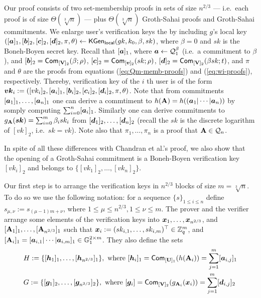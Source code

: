 Our proof consists of two set-membership proofs in sets of size $n^{2/3}$ --- i.e.~each proof is of size $\Theta(\sqrt[3]{n})$ ---  plus $\Theta(\sqrt[3]{n})$ Groth-Sahai proofs and Groth-Sahai commitments.
We enlarge user's verification keys the by including $g$'s local key $([{\boldsymbol{a}}]_1,[{\boldsymbol{b}}]_2,[{\boldsymbol{c}}]_2,[{\boldsymbol{d}}]_2, \pi, \theta)\gets \mathsf{KGen}_{\mathsf{local}}(gk,k_0,\beta,sk)$, where $\beta=0$ and $sk$ is the Boneh-Boyen secret key. Recall that $[{\boldsymbol{a}}]_1$, where ${\boldsymbol{a}}\gets\mathcal{Q}_1^\beta$ (i.e.~a commitment to $\beta$), and $[{\boldsymbol{b}}]_2=\mathsf{Com}_{[\mathbf{{V}}]_2}(\beta;\rho)$, $[{\boldsymbol{c}}]_2=\mathsf{Com}_{[{\boldsymbol{v}}]_2}(sk;\rho)$, $[{\boldsymbol{d}}]_2 = \mathsf{Com}_{[\mathbf{{V}}]_2}(\beta sk;t)$, and $\pi$ and $\theta$ are the proofs from equations (\ref{eq:Qm-memb-proofs}) and (\ref{eq:wi-proofs}), respectively. Thereby, verification key of the $i$ th user is of the form ${\boldsymbol{vk}}_i:=([vk_i]_2,[{\boldsymbol{a}}_i]_1,[{\boldsymbol{b}}_i]_2,[{\boldsymbol{c}}_i]_2,[{\boldsymbol{d}}_i]_2,\pi,\theta)$. Note that from commitments $[{\boldsymbol{a}}_1]_1,\ldots,[{\boldsymbol{a}}_n]_1$ one can derive a commtiment to $h(\mathbf{{A}})=h(({\boldsymbol{a}}_1|\cdots|{\boldsymbol{a}}_n))$ by somply computing $\sum_{i=0}^n [{\boldsymbol{a}}_i]_1$. Similarly one can derive commitments to $g_{\mathbf{{A}}}({\boldsymbol{sk}}) = \sum_{i=0}^m\beta_i sk_i$ from $[{\boldsymbol{d}}_1]_2,\ldots,[{\boldsymbol{d}}_n]_2$ (recall the $sk$ is the discrete logarithm of $[vk]_2$, i.e.~$sk=vk$). Note also that $\pi_1,\ldots,\pi_n$ is a proof that $\mathbf{{A}}\in\mathcal{Q}_n$.

In spite of all these differences with Chandran et al.'s proof, we also show that the opening of a Groth-Sahai commitment is a Boneh-Boyen verification key $[vk_i]_2$ and belongs to $\{[vk_1]_2,\ldots,[vk_n]_2\}$.

Our first step is to arrange the verification keys in $n^{2/3}$ blocks of size $m=\sqrt[3]{n}$. To do so we use the following notation: for a sequence $\{s\}_{1\leq i \leq n}$ define $s_{\mu,\nu}:=s_{(\mu-1)m+\nu}$, where  $1\leq\mu\leq n^{2/3},1\leq \nu\leq m$.  The prover and the verifier arrange some elements of the verification keys into ${\boldsymbol{x}}_1,\ldots, {\boldsymbol{x}}_{n^{2/3}}$, and $[\mathbf{{A}}_1]_1,\ldots, [\mathbf{{A}}_{n^{2/3}}]_1$ such that ${\boldsymbol{x}}_i:= (sk_{i,1},\ldots,sk_{i,m})^\top\in\mathbb{Z}_q^m$,  and $[\mathbf{{A}}_i]_1=[{\boldsymbol{a}}_{i,1}|\cdots|{\boldsymbol{a}}_{i,m}]_1\in\mathbb{G}^{2\times m}_1$. They also define the sets
\begin{align*}
&H:=\{[{\boldsymbol{h}}_1]_1,\ldots,\allowbreak [{\boldsymbol{h}}_{n^{2/3}}]_1\},\text{ where }[{\boldsymbol{h}}_i]_1 = \mathsf{Com}_{[\mathbf{{U}}]_1}(h(\mathbf{{A}}_i)) = \sum_{j=1}^m [{\boldsymbol{a}}_{i,j}]_1 \\
&G:=\{[{\boldsymbol{g}}_1]_2,\ldots,[{\boldsymbol{g}}_{n^{2/3}}]_2\},\text{ where } [{\boldsymbol{g}}_i] = \mathsf{Com}_{[\mathbf{{V}}]_2}(g_{\mathbf{{A}}_i}({\boldsymbol{x}}_i)) = \sum_{j=1}^m [{\boldsymbol{d}}_{i,j}]_2
\end{align*}

